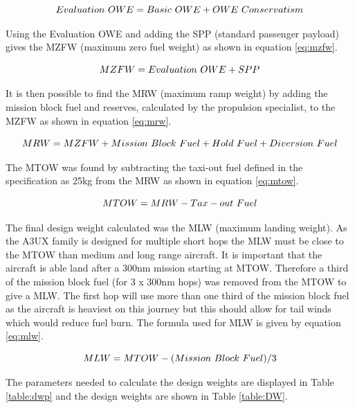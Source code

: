 \documentclass[11pt]{article}
\begin{document}
\begin{equation} \label{eq:EOWE}
\centering
Evaluation \ OWE = Basic \ OWE  + OWE \ Conservatism
\end{equation}

Using the Evaluation OWE and adding the SPP (standard passenger payload) gives the MZFW (maximum zero fuel weight) as shown in equation \ref{eq:mzfw}.

\begin{equation} \label{eq:mzfw}
\centering
MZFW = Evaluation \ OWE + SPP
\end{equation}

It is then possible to find the MRW (maximum ramp weight) by adding the mission block fuel and reserves, calculated by the propulsion specialist, to the MZFW as shown in equation \ref{eq:mrw}.

\begin{equation} \label{eq:mrw}
\centering
MRW = MZFW + Mission \ Block \ Fuel + Hold \ Fuel + Diversion \ Fuel
\end{equation}

The MTOW was found by subtracting the taxi-out fuel defined in the specification as 25kg from the MRW as shown in equation \ref{eq:mtow}.

\begin{equation} \label{eq:mtow}
\centering
MTOW = MRW - Tax-out \ Fuel
\end{equation}

The final design weight calculated was the MLW (maximum landing weight). As the A3UX family is designed for multiple short hops the MLW must be close to the MTOW than medium and long range aircraft. It is important that the aircraft is able land after a 300nm mission starting at MTOW. Therefore a third of the mission block fuel (for 3 x 300nm hops) was removed from the MTOW to give a MLW. The first hop will use more than one third of the mission block fuel as the aircraft is heaviest on this journey but this should allow for tail winds which would reduce fuel burn. The formula used for MLW is given by equation \ref{eq:mlw}.

\begin{equation} \label{eq:mlw}
\centering
MLW = MTOW - (Mission \ Block \ Fuel) / 3
\end{equation}

The parameters needed to calculate the design weights are displayed in Table \ref{table:dwp} and the design weights are shown in Table \ref{table:DW}.
\end{document}
